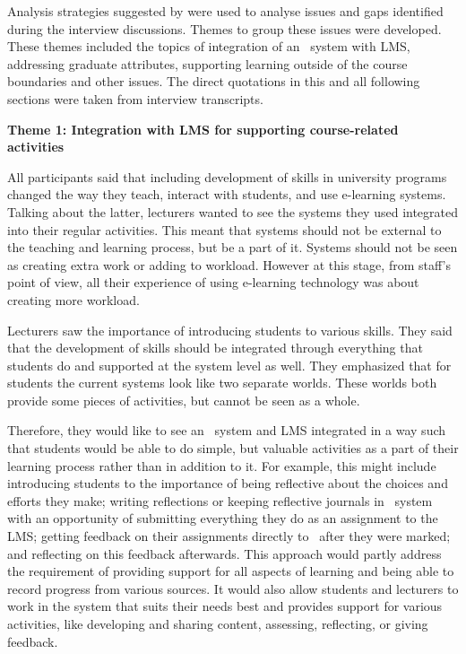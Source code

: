 Analysis strategies suggested by \citet{Marshall2010} were used to analyse
issues and gaps identified during the interview discussions. Themes to group
these issues were developed. These themes included the topics of integration of
an \ep~system with LMS, addressing graduate attributes, supporting learning
outside of the course boundaries and other issues. The direct quotations in this
and all following sections were taken from interview transcripts.

\textbf{Theme 1: Integration with LMS for supporting course-related activities}

All participants said that including development of \LLLs skills in university
programs changed the way they teach, interact with students, and use e-learning
systems. Talking about the latter, lecturers wanted to see the systems they used
integrated into their regular activities. This meant that systems should not be
external to the teaching and learning process, but be a part of it. Systems
should not be seen as creating extra work or adding to workload. However at
this stage, from staff's point of view, all their experience of using e-learning
technology was about creating more workload.


Lecturers saw the importance of introducing students to various \LLLs skills.
They said that the development of \LLLs skills should be integrated through
everything that students do and supported at the system level as well. They
emphasized that for students the current systems look like two separate worlds.
These worlds both provide some pieces of activities, but cannot be seen as a
whole.


Therefore, they would like to see an \ep~system and LMS integrated in a way
such that students would be able to do simple, but valuable activities as a part
of their learning process rather than in addition to it. For example, this might
include introducing students to the importance of being reflective about the
choices and efforts they make; writing reflections or keeping reflective
journals in \ep~system with an opportunity of submitting everything they do as
an assignment to the LMS; getting feedback on their assignments directly to
\ep~after they were marked; and reflecting on this feedback afterwards. This
approach would partly address the requirement of providing support for all
aspects of learning and being able to record progress from various sources. It
would also allow students and lecturers to work in the system that suits their
needs best and provides support for various activities, like developing and
sharing content, assessing, reflecting, or giving feedback.


